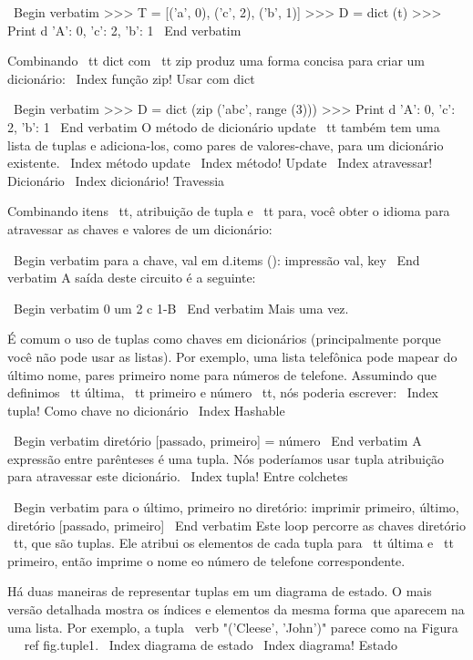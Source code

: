 \documentclass[10pt]{book}
\begin{document}
\begin {itemize}
{{{{{{{{{\ Begin {verbatim}
>>> T = [('a', 0), ('c', 2), ('b', 1)]
>>> D = dict (t)
>>> Print d
{'A': 0, 'c': 2, 'b': 1}
\ End {verbatim}

Combinando {\ tt dict} com {\ tt zip} produz uma forma concisa
para criar um dicionário:
\ Index {função zip! Usar com dict}

\ Begin {verbatim}
>>> D = dict (zip ('abc', range (3)))
>>> Print d
{'A': 0, 'c': 2, 'b': 1}
\ End {verbatim}
%
O método de dicionário {update \ tt} também tem uma lista de tuplas
e adiciona-los, como pares de valores-chave, para um dicionário existente.
\ Index {método update}
\ Index {método! Update}
\ Index {atravessar! Dicionário}
\ Index {dicionário! Travessia}

Combinando itens {\ tt}, atribuição de tupla e {\ tt para}, você
obter o idioma para atravessar as chaves e valores de um dicionário:

\ Begin {verbatim}
para a chave, val em d.items ():
    impressão val, key
\ End {verbatim}
%
A saída deste circuito é a seguinte:

\ Begin {verbatim}
0 um
2 c
1-B
\ End {verbatim}
%
Mais uma vez.

É comum o uso de tuplas como chaves em dicionários (principalmente porque
você não pode usar as listas). Por exemplo, uma lista telefônica pode mapear
do último nome, pares primeiro nome para números de telefone. Assumindo
que definimos {\ tt última}, {\ tt primeiro} e {número \ tt}, nós
poderia escrever:
\ Index {tupla! Como chave no dicionário}
\ Index {} Hashable

\ Begin {verbatim}
diretório [passado, primeiro] = número
\ End {verbatim}
%
A expressão entre parênteses é uma tupla. Nós poderíamos usar tupla
atribuição para atravessar este dicionário.
\ Index {tupla! Entre colchetes}

\ Begin {verbatim}
para o último, primeiro no diretório:
    imprimir primeiro, último, diretório [passado, primeiro]
\ End {verbatim}
%
Este loop percorre as chaves {diretório \ tt}, que são tuplas. Ele
atribui os elementos de cada tupla para {\ tt última} e {\ tt primeiro}, então
imprime o nome eo número de telefone correspondente.

Há duas maneiras de representar tuplas em um diagrama de estado. O mais
versão detalhada mostra os índices e elementos da mesma forma que aparecem na
uma lista. Por exemplo, a tupla \ verb "('Cleese', 'John')" parece
como na Figura ~ \ ref {fig.tuple1}.
\ Index {diagrama de estado}
\ Index {diagrama! Estado}

}}}}}}}}}
\end{itemize}
\end{document}
